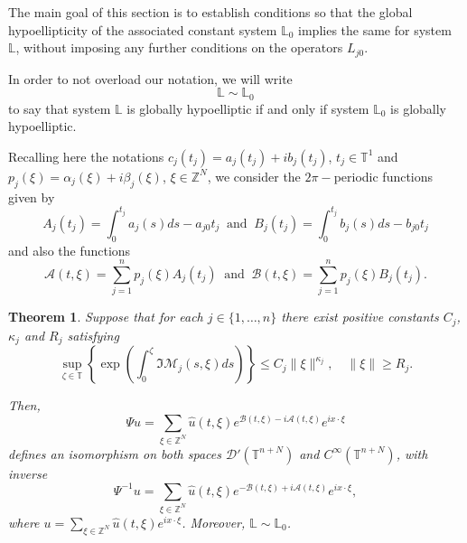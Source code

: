 \documentclass[12pt]{elsarticle}
\newtheorem{theorem}{Theorem}[section]
\numberwithin{equation}{section}
\begin{document}
The main goal of this section is to establish conditions so that the global hypoellipticity of the associated constant system $\mathbb{L}_0$ implies the same for system $\mathbb{L}$, without imposing any further conditions on the operators $L_{j0}$.


In order to not overload our notation, we will write  
$$
\mathbb{L} \sim \mathbb{L}_0
$$
to say that system $\mathbb{L}$ is globally hypoelliptic  if and only if system  $\mathbb{L}_0$ is globally hypoelliptic.





Recalling here the notations $c_j(t_j) = a_j(t_j) + ib_j(t_j)$, $t_j\in\mathbb{T}^1$ and $p_j(\xi) = \alpha_j(\xi) + i \beta_j(\xi)$, $\xi\in\mathbb{Z}^N$, we consider the $2\pi-$periodic functions 
given by
$$
A_j(t_j)  = \int_{0}^{t_j}a_j(s)ds - a_{j0} t_j \ \textrm{ and } \
B_j(t_j)  = \int_{0}^{t_j}b_j(s)ds - b_{j0} t_j
$$
and also the functions 
$$
\mathcal{A}(t,\xi) = \sum_{j=1}^{n} p_j(\xi) A_j(t_j) \ \textrm{ and } \
\mathcal{B}(t,\xi) = \sum_{j=1}^{n} p_j(\xi) B_j(t_j).
$$

\begin{theorem}\label{t-general-reduction}
	Suppose that for each $j\in\{1,\ldots,n\}$ there exist positive cons\-tants $C_j$, $\kappa_j$ and $R_j$ satisfying
	\begin{equation}\label{general-cond-reduc}
	\sup_{\zeta \in \mathbb{T}}\left\{ 
	\exp \left(\int_{0}^{\zeta} \Im \mathcal{M}_{j}(s,\xi) ds\right) \right\} \leq 
	C_j \|\xi\|^{\kappa_j}, \quad  \|\xi\| \geq R_j.
	\end{equation}
	
	Then, 
	\begin{equation}\label{general-Psi}
	\Psi u = \sum_{\xi \in \mathbb{Z}^N} \widehat{u}(t, \xi)
	e^{\mathcal{B}(t,\xi) -i \mathcal{A}(t,\xi) } e^{i x \cdot  \xi}
	\end{equation}
	defines an isomorphism on both spaces $\mathcal{D}'(\mathbb{T}^{n+N})$ and $C^{\infty}(\mathbb{T}^{n+N})$, with inverse 
	\begin{equation*}
	\Psi^{-1} u = \sum_{\xi \in \mathbb{Z}^N} \widehat{u}(t, \xi)
	e^{-\mathcal{B}(t,\xi) + i \mathcal{A}(t,\xi) } e^{i x \cdot  \xi},
	\end{equation*}
	where  $u = \sum_{\xi \in \mathbb{Z}^N} \widehat{u}(t, \xi)  e^{i x \cdot  \xi}$. Moreover, $\mathbb{L} \sim \mathbb{L}_{0}$.
\end{theorem}
\end{document}
